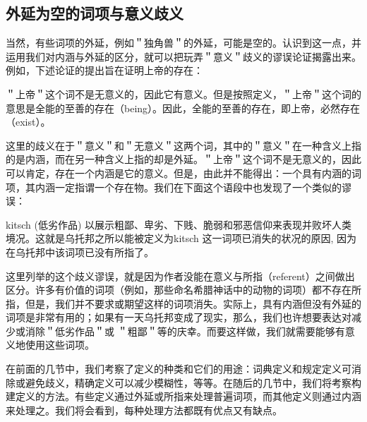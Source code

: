 \subsection{外延为空的词项与意义歧义}

当然，有些词项的外延，例如＂独角兽＂的外延，可能是空的。认识到这一点，并运用我们对内涵与外延的区分，就可以把玩弄＂意义＂歧义的谬误论证揭露出来。例如，下述论证的提出旨在证明上帝的存在：

\begin{displayquote}
＂上帝＂这个词不是无意义的，因此它有意义。但是按照定义，＂上帝＂这个词的意思是全能的至善的存在（being）。因此，全能的至善的存在，即上帝，必然存在（exist）。
\end{displayquote}

这里的歧义在于＂意义＂和＂无意义＂这两个词，其中的＂意义＂在一种含义上指的是内涵，而在另一种含义上指的却是外延。＂上帝＂这个词不是无意义的，因此可以肯定，存在一个内涵是它的意义。但是，由此并不能得出：一个具有内涵的词项，其内涵一定指谓一个存在物。\cite{gombocz1997}我们在下面这个语段中也发现了一个类似的谬误：

\begin{displayquote}
kitsch (低劣作品) 以展示粗鄙、卑劣、下贱、脆弱和邪恶信仰来表现并败坏人类境况。这就是乌托邦之所以能被定义为kitsch 这一词项已消失的状况的原因, 因为在乌托邦中该词项已没有所指了。\cite{sisk1988}
\end{displayquote}

这里列举的这个歧义谬误，就是因为作者没能在意义与所指（referent）之间做出区分。许多有价值的词项（例如，那些命名希腊神话中的动物的词项）都不存在所指，但是，我们并不要求或期望这样的词项消失。实际上，具有内涵但没有外延的词项是非常有用的；如果有一天乌托邦变成了现实，那么，我们也许想要表达对减少或消除＂低劣作品＂或 ＂粗鄙＂等的庆幸。而要这样做，我们就需要能够有意义地使用这些词项。

在前面的几节中，我们考察了定义的种类和它们的用途：词典定义和规定定义可消除或避免歧义，精确定义可以减少模糊性，等等。在随后的几节中，我们将考察构建定义的方法。有些定义通过外延或所指来处理普遍词项，而其他定义则通过内涵来处理之。我们将会看到，每种处理方法都既有优点又有缺点。

